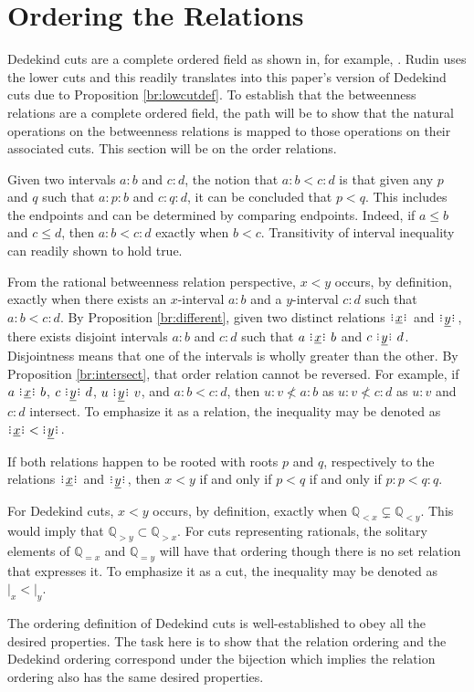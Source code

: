 \documentclass[12pt]{article}
\newcommand{\qcut}[2][x]{\ensuremath{\mathbb{Q}_{#2 #1}}}
\newcommand{\qlt}[1][x]{\qcut[#1]{<}}
\newcommand{\qeq}[1][x]{\qcut[#1]{=}}
\newcommand{\qgt}[1][x]{\qcut[#1]{>}}
\newcommand{\cut}[1][x]{{\vert}_{#1} }
\newcommand{\yrel}{\xrel[y]}
\begin{document}
\section{Ordering the Relations}

Dedekind cuts are a complete ordered field as shown in, for example, \cite{rudin}. Rudin uses the lower cuts and this readily translates into this paper's version of Dedekind cuts due to Proposition \ref{br:lowcutdef}. To establish that  the betweenness relations are a complete ordered field, the path will be to show that the natural operations on the betweenness relations is mapped to those operations on their associated cuts. This section will be on the order relations.  

Given two intervals $a:b$ and $c:d$, the notion that $a:b < c:d$ is that given any $p$ and $q$ such that $a:p:b$ and $c:q:d$, it can be concluded that $p < q$. This includes the endpoints and can be determined by comparing endpoints. Indeed, if $a\leq b$ and $c \leq d$, then $a:b < c:d$ exactly when $b < c$. Transitivity of interval inequality can readily shown to hold true. 

From the rational betweenness relation perspective, $x < y$ occurs, by definition, exactly when there exists an $x$-interval $a:b$ and a $y$-interval $c:d$ such that $a:b < c:d$. By Proposition \ref{br:different}, given two distinct relations $\xrel$ and $\yrel$, there exists disjoint intervals $a:b$ and $c:d$ such that $a \xrel b$ and $c \yrel d$. Disjointness means that one of the intervals is wholly greater than the other. By Proposition \ref{br:intersect}, that order relation cannot be reversed. For example, if $a \xrel b$, $c \xrel[y] d$, $u \yrel v$, and $a:b < c:d$, then $u:v \nless a:b$ as $u:v \nless c:d$ as $u:v$ and $c:d$ intersect.  To emphasize it as a relation, the inequality may be denoted as $\xrel  \:<\: \yrel$. 

If both relations happen to be  rooted with roots $p$ and $q$, respectively to the relations $\xrel$ and $\yrel$, then $x<y$ if and only if $p < q$ if and only if $p:p < q:q$. 

For Dedekind cuts, $x < y$ occurs, by definition, exactly when $\qlt \subsetneq \qlt[y]$. This would imply that $\qgt[y] \subset \qgt$. For cuts representing rationals, the solitary elements of $\qeq$ and $\qeq[y]$ will have that ordering though there is no set relation that expresses it. To emphasize it as a cut, the inequality may be denoted as $\cut < \cut[y]$.

The ordering definition of Dedekind cuts is well-established to obey all the desired properties. The task here is to show that the relation ordering and the Dedekind ordering correspond under the bijection which implies the relation ordering also has the same desired properties. 
\end{document}
